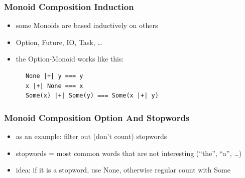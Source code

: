 \documentclass[aspectratio=169]{beamer}
\begin{document}
\begin{frame}[fragile]
  \frametitle{Monoid Composition \textemdash{} Induction}
  \begin{itemize}
  \item some Monoids are based inductively on others
  \item Option, Future, IO, Task, \ldots{}
  \item the Option-Monoid works like this:
  \end{itemize}
  \begin{center}
    \vspace{5mm}
    \begin{verbatim}
      None |+| y === y
      x |+| None === x
      Some(x) |+| Some(y) === Some(x |+| y)
    \end{verbatim}
  \end{center}
\end{frame}

\begin{frame}[fragile]
  \frametitle{Monoid Composition \textemdash{} Option And Stopwords}
  \begin{itemize}
  \item as an example: filter out (don't count) stopwords
  \item stopwords = most common words that are not interesting (``the'', ``a'', \ldots{})
  \item idea: if it is a stopword, use None, otherwise regular count with Some
  \end{itemize}
\end{frame}
\end{document}
